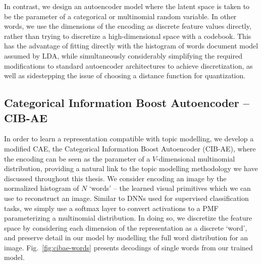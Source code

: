 In contrast, we design an autoencoder model where the latent space is taken to be the parameter of a categorical or multinomial random variable. In other words, we use the dimensions of the encoding as discrete feature values directly, rather than trying to discretize a high-dimensional space with a codebook. This has the advantage of fitting directly with the histogram of words document model assumed by LDA, while simultaneously considerably simplifying the required modifications to standard autoencoder architectures to achieve discretization, as well as sidestepping the issue of choosing a distance function for quantization.

\subsection{Categorical Information Boost Autoencoder -- CIB-AE}

In order to learn a representation compatible with topic modelling, we develop a modified CAE, the Categorical Information Boost Autoencoder (CIB-AE), where the encoding can be seen as the parameter of a $V$-dimensional multinomial distribution, providing a natural link to the topic modelling methodology we have discussed throughout this thesis. We consider encoding an image by the normalized histogram of $N$ `words' -- the learned visual primitives which we can use to reconstruct an image. Similar to DNNs used for supervised classification tasks, we simply use a softmax layer to convert activations to a PMF parameterizing a multinomial distribution. In doing so, we discretize the feature space by considering each dimension of the representation as a discrete `word', and preserve detail in our model by modelling the full word distribution for an image. Fig.~\ref{fig:cibae-words} presents decodings of single words from our trained model.

